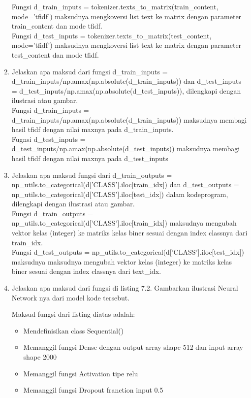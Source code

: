 \begin{enumerate}
	Fungsi d\_train\_inputs = tokenizer.texts\_to\_matrix(train\_content, mode='tfidf') maksudnya mengkoversi list text ke matrix dengan parameter train\_content dan mode tfidf.\\
	Fungsi d\_test\_inputs = tokenizer.texts\_to\_matrix(test\_content, mode='tfidf') maksudnya mengkoversi list text ke matrix dengan parameter test\_content dan mode tfidf.
	\item Jelaskan apa maksud dari fungsi d\_train\_inputs = d\_train\_inputs/np.amax(np.absolute(d\_train\_inputs)) dan d\_test\_inputs = d\_test\_inputs/np.amax(np.absolute(d\_test\_inputs)), dilengkapi dengan ilustrasi atau gambar.\\
	Fungsi d\_train\_inputs = d\_train\_inputs/np.amax(np.absolute(d\_train\_inputs)) maksudnya membagi hasil tfidf dengan nilai maxnya pada d\_train\_inputs.\\
	Fugnsi d\_test\_inputs = d\_test\_inputs/np.amax(np.absolute(d\_test\_inputs)) maksudnya membagi hasil tfidf dengan nilai maxnya pada d\_test\_inputs\\
	\item Jelaskan apa maksud fungsi dari d\_train\_outputs = np\_utils.to\_categorical(d['CLASS'].iloc[train\_idx]) dan d\_test\_outputs = np\_utils.to\_categorical(d['CLASS'].iloc[test\_idx]) dalam kodeprogram, dilengkapi dengan ilustrasi atau gambar.\\
	Fungsi d\_train\_outputs = np\_utils.to\_categorical(d['CLASS'].iloc[train\_idx]) maksudnya mengubah vektor kelas (integer) ke matriks kelas biner sesuai dengan index classnya dari train\_idx.\\
	Fungsi d\_test\_outputs = np\_utils.to\_categorical(d['CLASS'].iloc[test\_idx]) maksudnya  maksudnya mengubah vektor kelas (integer) ke matriks kelas biner sesuai dengan index classnya dari text\_idx.\\
	\item Jelaskan apa maksud dari fungsi di listing 7.2.  Gambarkan ilustrasi Neural Network nya dari model kode tersebut.
	
	Maksud fungsi dari listing diatas adalah:
	\begin{itemize}
		\item Mendefinisikan class Sequential()
		\item Memanggil fungsi Dense dengan output array shape 512 dan input array shape 2000
		\item Memanggil fungsi Activation tipe relu
		\item Memanggil fungsi Dropout franction input 0.5

\end{itemize}
\end{enumerate}
